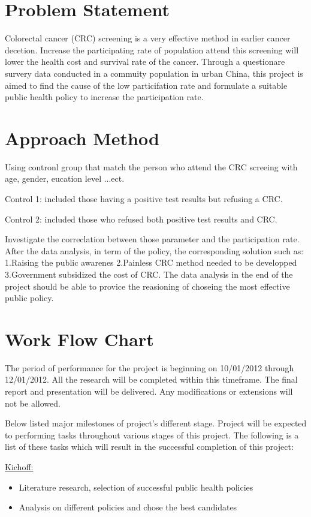 \documentclass[12pt,letterpaper]{article}
\theoremstyle{definition}
\begin{document}
\section{Problem Statement}

Colorectal cancer (CRC) screening is a very effective method in earlier cancer decetion. Increase the participating rate of population attend this screening will lower the health cost and survival rate of the cancer. Through a questionare survery data conducted in a commuity population in urban China, this project is aimed to find the cause of the low particifation rate and formulate a suitable public health policy to increase the participation rate.  

\section{Approach Method} 
Using contronl group that match the person who attend the CRC screeing with age, gender, eucation level ...ect.

Control 1: included those having a positive test results but refusing a CRC. 

Control 2: included those who refused both positive test results and CRC.

Investigate the correclation between those parameter and the participation rate. After the data analysis, in term of the policy, the corresponding solution such as: 1.Raising the public awarenes 2.Painless CRC method needed to be developped 3.Government subsidized the cost of CRC.
The data analysis in the end of the project should be able to provice the reasioning of choseing the most effective public policy.

\section{Work Flow Chart}
The period of performance for the project is beginning on 10/01/2012 through 12/01/2012. All the research will be completed within this timeframe. The final report and presentation will be delivered. Any modifications or extensions will not be allowed.

Below listed major milestones of project’s different stage. Project will be expected to performing tasks throughout various stages of this project.  The following is a list of these tasks which will result in the successful completion of this project:


\underline {Kichoff:}
\begin{itemize}
    \item Literature research, selection of successful public health policies
    \item Analysis on different policies and chose the best candidates
\end{itemize}
\end{document}
